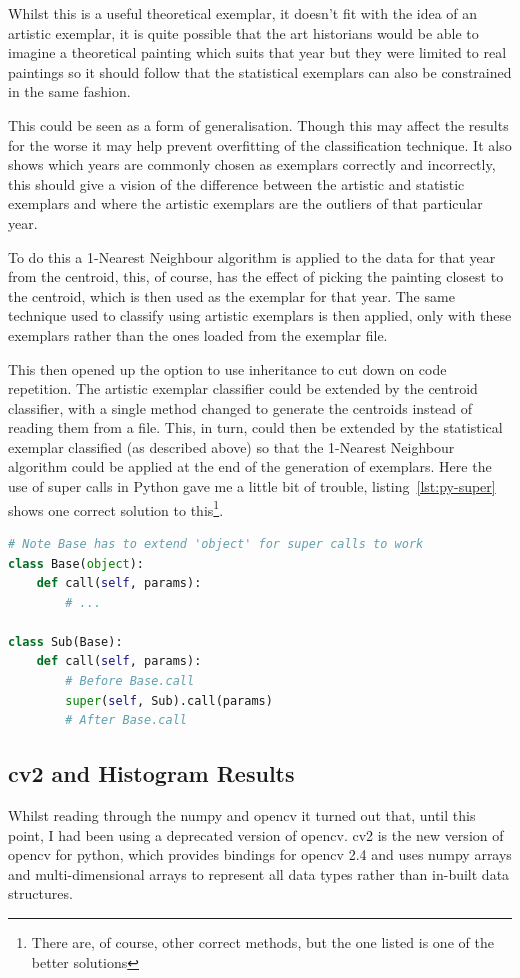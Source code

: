 Whilst this is a useful theoretical exemplar, it doesn't fit with the idea of an artistic 
exemplar, it is quite possible that the art historians would be able to imagine a theoretical
painting which suits that year but they were limited to real paintings so it should follow that
the statistical exemplars can also be constrained in the same fashion.

This could be seen as a form of generalisation. Though this may affect the results for the worse
it may help prevent overfitting of the classification technique. It also shows which years are 
commonly chosen as exemplars correctly and incorrectly, this should give a vision of the 
difference between the artistic and statistic exemplars and where the artistic exemplars are the
outliers of that particular year.

To do this a 1-Nearest Neighbour algorithm is applied to the data for that year from the centroid,
this, of course, has the effect of picking the painting closest to the centroid, which is then
used as the exemplar for that year. The same technique used to classify using artistic exemplars
is then applied, only with these exemplars rather than the ones loaded from the exemplar file.

This then opened up the option to use inheritance to cut down on code repetition. The artistic
exemplar classifier could be extended by the centroid classifier, with a single method changed to
generate the centroids instead of reading them from a file. This, in turn, could then be extended
by the statistical exemplar classified (as described above) so that the 1-Nearest Neighbour
algorithm could be applied at the end of the generation of exemplars. Here the use of super calls
in Python gave me a little bit of trouble, listing~\ref{lst:py-super} shows one correct solution
to this\footnote{There are, of course, other correct methods, but the one listed is one of the 
better solutions}.

\begin{lstlisting}[language=python, breaklines=true, label=lst:py-super, 
caption={Super method calls in Python}, frame=single]
# Note Base has to extend 'object' for super calls to work
class Base(object):
    def call(self, params):
        # ...

class Sub(Base):
    def call(self, params):
        # Before Base.call
        super(self, Sub).call(params)
        # After Base.call
\end{lstlisting}


\subsection{cv2 and Histogram Results}
Whilst reading through the numpy and \gls{opencv} it turned out that, until this point, I had been
using a deprecated version of \gls{opencv}. \gls{cv2} is the new version of \gls{opencv} for 
python, which provides bindings for \gls{opencv} 2.4 and uses numpy arrays and multi-dimensional 
arrays to represent all data types rather than in-built data structures.

